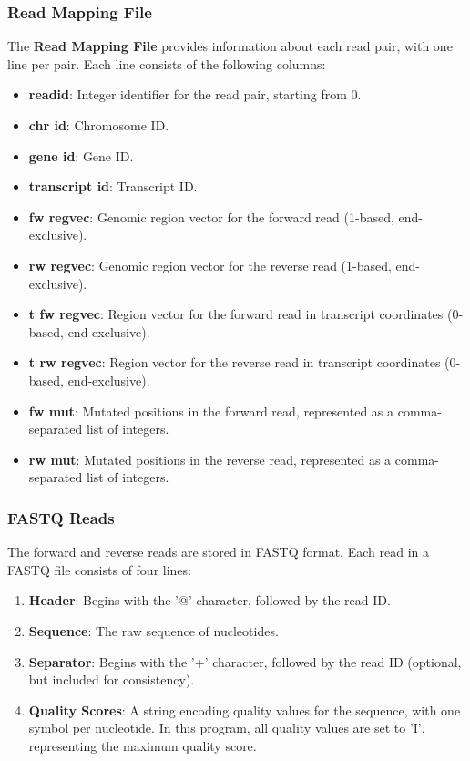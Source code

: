 \documentclass{article}
\begin{document}
    \subsubsection{Read Mapping File}
    The \textbf{Read Mapping File} provides information about each read pair, with one line per pair. Each line consists of the following columns:

    \begin{itemize}
        \item \textbf{readid}: Integer identifier for the read pair, starting from 0.
        \item \textbf{chr id}: Chromosome ID.
        \item \textbf{gene id}: Gene ID.
        \item \textbf{transcript id}: Transcript ID.
        \item \textbf{fw regvec}: Genomic region vector for the forward read (1-based, end-exclusive).
        \item \textbf{rw regvec}: Genomic region vector for the reverse read (1-based, end-exclusive).
        \item \textbf{t fw regvec}: Region vector for the forward read in transcript coordinates (0-based, end-exclusive).
        \item \textbf{t rw regvec}: Region vector for the reverse read in transcript coordinates (0-based, end-exclusive).
        \item \textbf{fw mut}: Mutated positions in the forward read, represented as a comma-separated list of integers.
        \item \textbf{rw mut}: Mutated positions in the reverse read, represented as a comma-separated list of integers.
    \end{itemize}

    \subsubsection{FASTQ Reads}
    The forward and reverse reads are stored in FASTQ format. Each read in a FASTQ file consists of four lines:

    \begin{enumerate}
        \item \textbf{Header}: Begins with the '@' character, followed by the read ID.
        \item \textbf{Sequence}: The raw sequence of nucleotides.
        \item \textbf{Separator}: Begins with the '+' character, followed by the read ID (optional, but included for consistency).
        \item \textbf{Quality Scores}: A string encoding quality values for the sequence, with one symbol per nucleotide. In this program, all quality values are set to 'I', representing the maximum quality score.
    \end{enumerate}
\end{document}
